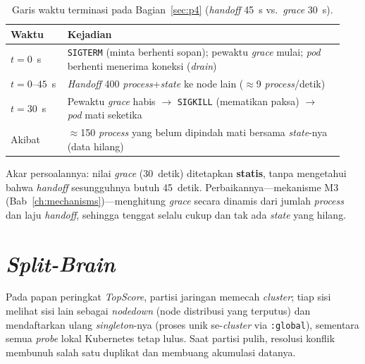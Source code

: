 \begin{table}[H]\centering\small
\caption{Garis waktu terminasi pada Bagian~\ref{sec:p4} (\emph{handoff} 45~s vs.\ \emph{grace} 30~s).}
\label{tab:p4-timeline}
\begin{tabular}{@{}p{0.16\linewidth}p{0.78\linewidth}@{}}
\toprule
\textbf{Waktu} & \textbf{Kejadian} \\
\midrule
$t = 0$~s & \texttt{SIGTERM} (minta berhenti sopan); pewaktu \emph{grace} mulai; \emph{pod} berhenti menerima koneksi (\emph{drain}) \\
$t = 0$--$45$~s & \emph{Handoff} 400 \emph{process}+\emph{state} ke node lain ($\approx$9 \emph{process}/detik) \\
$t = 30$~s & Pewaktu \emph{grace} habis $\rightarrow$ \texttt{SIGKILL} (mematikan paksa) $\rightarrow$ \emph{pod} mati seketika \\
Akibat & $\approx$150 \emph{process} yang belum dipindah mati bersama \emph{state}-nya (data hilang) \\
\bottomrule
\end{tabular}
\end{table}

\noindent Akar persoalannya: nilai \emph{grace} (30~detik) ditetapkan \textbf{statis}, tanpa
mengetahui bahwa \emph{handoff} sesungguhnya butuh 45~detik. Perbaikannya---mekanisme M3
(Bab~\ref{ch:mechanisms})---menghitung \emph{grace} secara dinamis dari jumlah \emph{process}
dan laju \emph{handoff}, sehingga tenggat selalu cukup dan tak ada \emph{state} yang hilang.

\section{\emph{Split-Brain}}
\label{sec:p5}
Pada papan peringkat \emph{TopScore}, partisi jaringan memecah \emph{cluster}; tiap sisi
melihat sisi lain sebagai \emph{nodedown} (node distribusi yang terputus) dan mendaftarkan
ulang \emph{singleton}-nya (proses unik se-\emph{cluster} via \texttt{:global}),
sementara semua \emph{probe} lokal Kubernetes tetap lulus. Saat partisi pulih, resolusi
konflik membunuh salah satu duplikat dan membuang akumulasi datanya.

